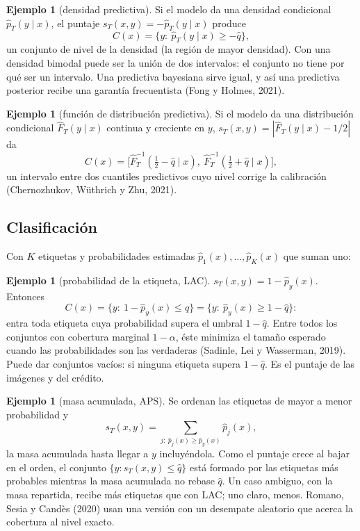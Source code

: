 \documentclass[11pt]{article}
\theoremstyle{plain}
\theoremstyle{definition}
\newtheorem{ejemplo}[teorema]{Ejemplo}
\theoremstyle{remark}
\newcommand{\qhat}{\widehat q}
\newcommand{\phat}{\widehat p}
\begin{document}
\begin{ejemplo}[densidad predictiva]
Si el modelo da una densidad condicional $\widehat p_T(y\mid x)$, el puntaje
$s_T(x,y)=-\widehat p_T(y\mid x)$ produce
\[
 C(x)=\{y:\ \widehat p_T(y\mid x)\ge-\qhat\},
\]
un conjunto de nivel de la densidad (la región de mayor densidad). Con una densidad bimodal puede ser
la unión de dos intervalos: el conjunto no tiene por qué ser un intervalo. Una predictiva bayesiana
sirve igual, y así una predictiva posterior recibe una garantía frecuentista (Fong y Holmes, 2021).
\end{ejemplo}

\begin{ejemplo}[función de distribución predictiva]
Si el modelo da una distribución condicional $\widehat F_T(y\mid x)$ continua y creciente en $y$,
$s_T(x,y)=|\widehat F_T(y\mid x)-1/2|$ da
\[
 C(x)=\bigl[\widehat F_T^{-1}(\tfrac12-\qhat\mid x),\ \widehat F_T^{-1}(\tfrac12+\qhat\mid x)\bigr],
\]
un intervalo entre dos cuantiles predictivos cuyo nivel corrige la calibración (Chernozhukov,
Wüthrich y Zhu, 2021).
\end{ejemplo}

\subsection{Clasificación}
Con $K$ etiquetas y probabilidades estimadas $\phat_1(x),\dots,\phat_K(x)$ que suman uno:

\begin{ejemplo}[probabilidad de la etiqueta, LAC]
$s_T(x,y)=1-\phat_y(x)$. Entonces
\[
 C(x)=\{y:\ 1-\phat_y(x)\le\qhat\}=\{y:\ \phat_y(x)\ge1-\qhat\}:
\]
entra toda etiqueta cuya probabilidad supera el umbral $1-\qhat$. Entre todos los conjuntos con
cobertura marginal $1-\alpha$, éste minimiza el tamaño esperado cuando las probabilidades son las
verdaderas (Sadinle, Lei y Wasserman, 2019). Puede dar conjuntos vacíos: si ninguna etiqueta supera
$1-\qhat$. Es el puntaje de las imágenes y del crédito.
\end{ejemplo}

\begin{ejemplo}[masa acumulada, APS]
Se ordenan las etiquetas de mayor a menor probabilidad y
\[
 s_T(x,y)=\sum_{j:\ \phat_j(x)\ge\phat_y(x)}\phat_j(x),
\]
la masa acumulada hasta llegar a $y$ incluyéndola. Como el puntaje crece al bajar en el orden, el
conjunto $\{y: s_T(x,y)\le\qhat\}$ está formado por las etiquetas más probables mientras la masa
acumulada no rebase $\qhat$. Un caso ambiguo, con la masa repartida, recibe más etiquetas que con
LAC; uno claro, menos. Romano, Sesia y Candès (2020) usan una versión con un desempate aleatorio
que acerca la cobertura al nivel exacto.
\end{ejemplo}
\end{document}
